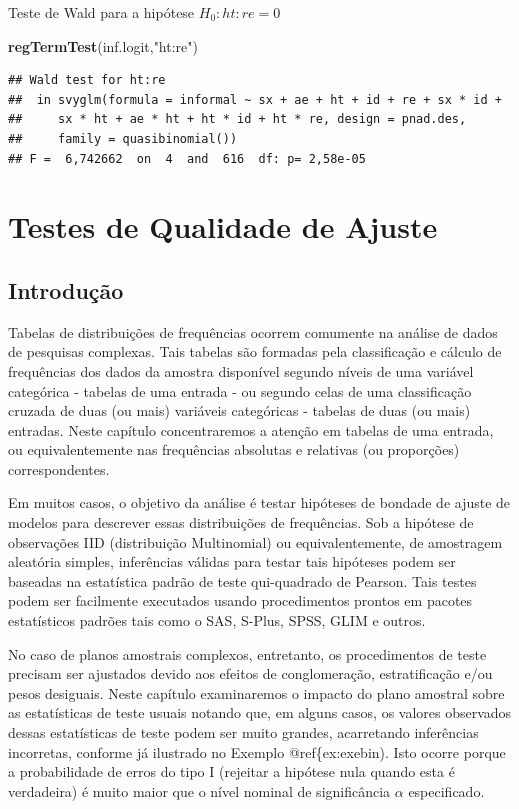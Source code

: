 \documentclass[]{book}
\newenvironment{Shaded}{\begin{snugshade}}{\end{snugshade}}
\newcommand{\KeywordTok}[1]{\textcolor[rgb]{0.13,0.29,0.53}{\textbf{#1}}}
\newcommand{\StringTok}[1]{\textcolor[rgb]{0.31,0.60,0.02}{#1}}
\newcommand{\NormalTok}[1]{#1}
\theoremstyle{definition}
\theoremstyle{definition}
\theoremstyle{definition}
\theoremstyle{remark}
\begin{document}
Teste de Wald para a hipótese \(H_0: ht:re=0\)

\begin{Shaded}
\begin{Highlighting}[]
\KeywordTok{regTermTest}\NormalTok{(inf.logit,}\StringTok{"ht:re"}\NormalTok{)}
\end{Highlighting}
\end{Shaded}

\begin{verbatim}
## Wald test for ht:re
##  in svyglm(formula = informal ~ sx + ae + ht + id + re + sx * id + 
##     sx * ht + ae * ht + ht * id + ht * re, design = pnad.des, 
##     family = quasibinomial())
## F =  6,742662  on  4  and  616  df: p= 2,58e-05
\end{verbatim}

\chapter{Testes de Qualidade de Ajuste}\label{testqualajust}

\section{Introdução}\label{introducao-1}

Tabelas de distribuições de frequências ocorrem comumente na análise de
dados de pesquisas complexas. Tais tabelas são formadas pela
classificação e cálculo de frequências dos dados da amostra disponível
segundo níveis de uma variável categórica - tabelas de uma entrada - ou
segundo celas de uma classificação cruzada de duas (ou mais) variáveis
categóricas - tabelas de duas (ou mais) entradas. Neste capítulo
concentraremos a atenção em tabelas de uma entrada, ou equivalentemente
nas frequências absolutas e relativas (ou proporções) correspondentes.

Em muitos casos, o objetivo da análise é testar hipóteses de bondade de
ajuste de modelos para descrever essas distribuições de frequências. Sob
a hipótese de observações IID (distribuição Multinomial) ou
equivalentemente, de amostragem aleatória simples, inferências válidas
para testar tais hipóteses podem ser baseadas na estatística padrão de
teste qui-quadrado de Pearson. Tais testes podem ser facilmente
executados usando procedimentos prontos em pacotes estatísticos padrões
tais como o SAS, S-Plus, SPSS, GLIM e outros.

No caso de planos amostrais complexos, entretanto, os procedimentos de
teste precisam ser ajustados devido aos efeitos de conglomeração,
estratificação e/ou pesos desiguais. Neste capítulo examinaremos o
impacto do plano amostral sobre as estatísticas de teste usuais notando
que, em alguns casos, os valores observados dessas estatísticas de teste
podem ser muito grandes, acarretando inferências incorretas, conforme já
ilustrado no Exemplo @ref\{ex:exebin). Isto ocorre porque a
probabilidade de erros do tipo I (rejeitar a hipótese nula quando esta é
verdadeira) é muito maior que o nível nominal de significância
\(\alpha\) especificado.
\end{document}
